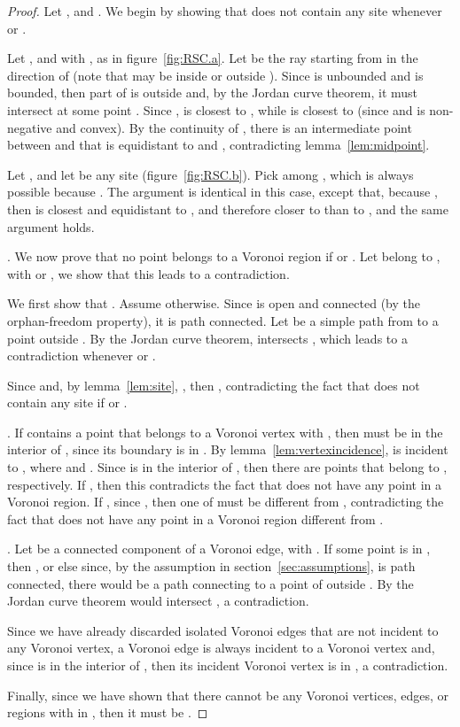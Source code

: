 \documentclass[11pt]{article}
\begin{document}
\begin{proof}
Let , and . 
We begin by showing that  does not contain any site  whenever  or . 


Let , and  with , as in figure~\ref{fig:RSC.a}. 
Let  be the ray starting from  in the direction of  
	(note that  may be inside or outside ). 
Since  is unbounded and  is bounded, then part of  is outside  and, 
	by the Jordan curve theorem, it must intersect  at some point . 
Since , 
	 is closest to , while  is closest to 
		(since  and  is non-negative and convex). 
By the continuity of , there is an intermediate point  between  and  
	that is equidistant to  and , contradicting lemma~\ref{lem:midpoint}. 

Let , and let  be any site (figure~\ref{fig:RSC.b}). 
Pick  among , 
	which is always possible because . 
The argument is identical in this case, except that, 
	because , then  is closest and equidistant to , 
	and therefore closer to  than to , and the same argument holds. 

\vspace*{0.05in}.
We now prove that no point  belongs to a Voronoi region  if  or . 
Let  belong to , with  or , we show that this leads to a contradiction. 

We first show that . 
Assume otherwise. Since  is open and connected (by the orphan-freedom property), it is path connected. 
Let  be a simple path from  to a point  outside . 
By the Jordan curve theorem,  intersects , 
	which leads to a contradiction whenever  or . 

Since  and, 
	by lemma~\ref{lem:site}, 
	, then , contradicting the fact that  does not contain any site  if  or . 

\vspace*{0.05in}.
If  contains a point  that belongs to a Voronoi vertex  with , 
	then  must be in the interior of , since its boundary  is in . 
By lemma~\ref{lem:vertexincidence},  is incident to , 
	where  and . 
Since  is in the interior of , then there are points 
	 that belong to , respectively. 
If , then this contradicts the fact that  does not have any point in a Voronoi region. 
If , since , then one of  must be different from , 
	contradicting the fact that  does not have any point in a Voronoi region different from . 

\vspace*{0.05in}.
Let  be a connected component of a Voronoi edge, with . 
If some point  is in , 
	then , or else since, by the assumption in section~\ref{sec:assumptions}, 
	 is path connected, there would be a path  connecting 
	 to a point of  outside . 
By the Jordan curve theorem  would intersect , a contradiction. 

Since we have already discarded isolated Voronoi edges that are not incident to any Voronoi vertex, 
	a Voronoi edge is always incident to a Voronoi vertex and, 
	since  is in the interior of , then its incident Voronoi vertex is in , 
	a contradiction. 

Finally, since we have shown that there cannot be any Voronoi vertices, edges, or regions 
	with  in , then it must be . 
\end{proof}
\end{document}
